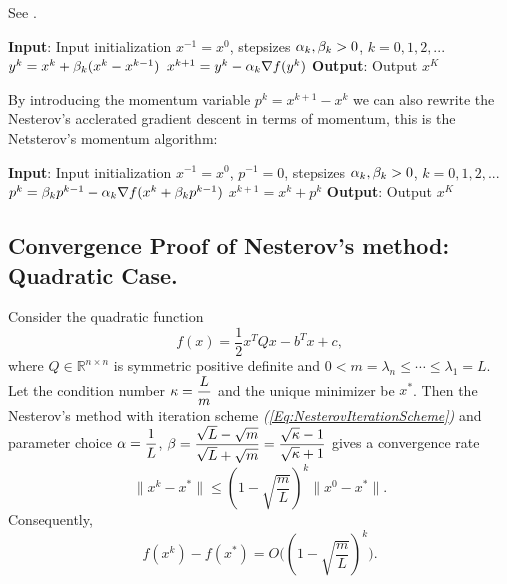 See \cite{Nesterov1983}.

\begin{algorithm}[H]
\caption{Nesterov's accelerated gradient descent}
\label{Alg:AGD}
\begin{algorithmic}[1]
\STATE \textbf{Input}: Input initialization $x^{-1}=x^0$, stepsizes $\alpha_k, \beta_k>0$, $k=0,1,2,...$
    \STATE $y^k=x^k+\beta_k(x^k-x^{k-1})$
    \STATE $x^{k+1}=y^k-\alpha_k \nabla f(y^k)$
\ENDFOR
\STATE \textbf{Output}: Output $x^K$
\end{algorithmic}
\end{algorithm}

By introducing the momentum variable $p^k=x^{k+1}-x^k$ we can also rewrite the Nesterov's acclerated gradient descent in terms of momentum, this is the Netsterov's momentum algorithm:

\begin{algorithm}[H]
\caption{Nesterov's momentum (equivalent to Nesterov's accelerated gradient descent)}
\label{Alg:NesterovMomentm}
\begin{algorithmic}[1]
\STATE \textbf{Input}: Input initialization $x^{-1}=x^0$, $p^{-1}=0$, stepsizes $\alpha_k, \beta_k>0$, $k=0,1,2,...$
    \STATE $p^k=\beta_k p^{k-1}-\alpha_k \nabla f(x^k+\beta_k p^{k-1})$
    \STATE $x^{k+1}=x^k+p^k$
\ENDFOR
\STATE \textbf{Output}: Output $x^K$
\end{algorithmic}
\end{algorithm}

\subsection{Convergence Proof of Nesterov's method: Quadratic Case.}

\begin{theorem}\label{Thm:NesterovConvergence:Quadratic}
Consider the quadratic function
\[
f(x) = \frac12 x^T Q x - b^T x + c,
\]
where $Q \in \mathbb{R}^{n\times n}$ is symmetric positive definite and $0 < m = \lambda_n \le \cdots \le \lambda_1 = L$.
Let the condition number $\kappa = \dfrac{L}{m}$ and the unique minimizer be $x^*$. Then the Nesterov's method with iteration scheme \emph{(\ref{Eq:NesterovIterationScheme})} and parameter choice $\alpha=\dfrac{1}{L}$, $\beta=\dfrac{\sqrt{L}-\sqrt{m}}{\sqrt{L}+\sqrt{m}}=\dfrac{\sqrt{\kappa}-1}{\sqrt{\kappa}+1}$ gives a convergence rate 
\begin{equation}\label{Thm:NesterovConvergence:Quadratic:Eq:Convergencex}
\|x^k-x^*\|
\le
\left(1-\sqrt{\frac{m}{L}}\right)^k
\|x^0-x^*\|.
\end{equation}
Consequently,
\begin{equation}\label{Thm:NesterovConvergence:Quadratic:Eq:Convergencef}
f(x^k)-f(x^*)
=
O
\Big(
\left(1-\sqrt{\frac{m}{L}}\right)^k
\Big).
\end{equation}
\end{theorem}

